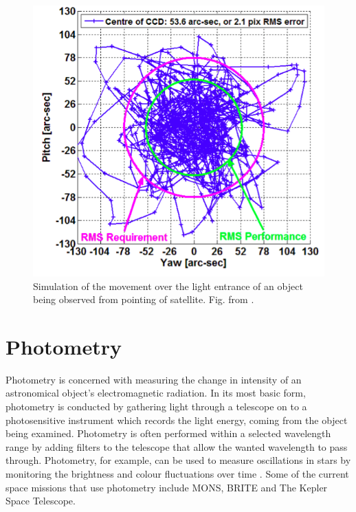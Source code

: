 \begin{figure}[h]
\centering
\includegraphics[width=.5\linewidth]{pointing.png}
\caption[]{Simulation of the movement over the light entrance of an object being observed from pointing of satellite. Fig. from \citep{brite}.}
\label{fig: pointing}
\end{figure}

\section{Photometry}
Photometry is concerned with measuring the change in intensity of an astronomical object's electromagnetic radiation. In its most basic form, photometry is conducted by gathering light through a telescope on to a photosensitive instrument which records the light energy, coming from the object being examined. Photometry is often performed within a selected wavelength range by adding filters to the telescope that allow the wanted wavelength to pass through. Photometry, for example, can be used to measure oscillations in stars by monitoring the brightness and colour fluctuations over time \citep{Mons}. Some of the current space missions that use photometry include MONS, BRITE and The Kepler Space Telescope.

